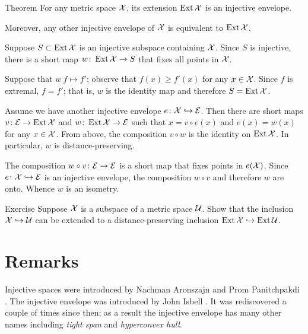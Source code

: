 \begin{thm}{Theorem}\label{thm:inj-envelope}
For any metric space $\mathcal{X}$, its extension $\mathop{\rm Ext}\nolimits\mathcal{X}$ is an injective envelope.

Moreover, any other injective envelope of $\mathcal{X}$ is equivalent to $\mathop{\rm Ext}\nolimits\mathcal{X}$.
\end{thm}

Suppose $S\subset \mathop{\rm Ext}\nolimits\mathcal{X}$ is an injective subspace containing $\mathcal{X}$.
Since $S$ is injective, there is a short map $w\colon\mathop{\rm Ext}\nolimits\mathcal{X}\to S$ that fixes all points in $\mathcal{X}$.

Suppose that $w\:f\mapsto f'$; observe that $f(x)\ge f'(x)$ for any $x\in \mathcal{X}$.
Since $f$ is extremal, $f=f'$;
that is, $w$ is the identity map and therefore $S=\mathop{\rm Ext}\nolimits\mathcal{X}$.

Assume we have another injective envelope $e\colon\mathcal{X}\hookrightarrow \mathcal{E}$.
Then there are short maps $v\colon\mathcal{E}\to \mathop{\rm Ext}\nolimits\mathcal{X}$ and $w\colon\mathop{\rm Ext}\nolimits\mathcal{X}\to \mathcal{E}$ such that $x=v\circ e(x)$ and $e(x)=w(x)$ for any $x\in\mathcal{X}$.
From above, the composition $v\circ w$ is the identity on $\mathop{\rm Ext}\nolimits\mathcal{X}$.
In particular, $w$ is distance-preserving.

The composition $w\circ v\colon\mathcal{E}\to \mathcal{E}$ is a short map that fixes points in $e(\mathcal{X})$.
Since $e\colon\mathcal{X}\hookrightarrow \mathcal{E}$ is an injective envelope, the composition $w\circ v$ and therefore $w$ are onto.
Whence $w$ is an isometry.
\qeds

\begin{thm}{Exercise}\label{ex:d-p-inclusion}
Suppose $\mathcal{X}$ is a subspace of a metric space $\mathcal{U}$.
Show that the inclusion $\mathcal{X}\hookrightarrow\mathcal{U}$ can be extended to a distance-preserving inclusion $\mathop{\rm Ext}\nolimits\mathcal{X}\hookrightarrow\mathop{\rm Ext}\nolimits\mathcal{U}$.
\end{thm}


\section{Remarks}

Injective spaces were introduced by Nachman Aronszajn and Prom Panitchpakdi \cite{aronszajn-panitchpakdi}.
The injective envelope was introduced by John Isbell \cite{isbell}.
It was rediscovered a couple of times since then;
as a result the injective envelope has many other names including \emph{tight span} and \emph{hyperconvex hull}.

